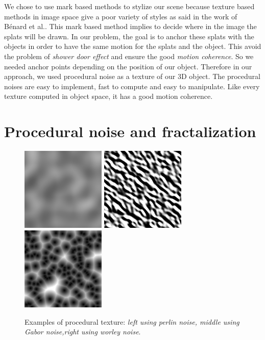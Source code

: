 We chose to use mark based methods to stylize our scene because texture based methods in image space give a poor variety of styles as said in the work of Bénard et al.\cite{benard_dynamic_2009}. This mark based method implies to decide where in the image the splats will be drawn. In our problem, the goal is to anchor these splats with the objects in order to have the same motion for the splats and the object. This avoid the problem of \textit{shower door effect} and ensure the good \textit{motion coherence}. So we needed anchor points depending on the position of our object. Therefore in our approach, we used procedural noise\cite{perlin_improving_2002} as a texture of our 3D object. The procedural noises are easy to implement, fast to compute and easy to manipulate. Like every texture computed in object space, it has a good motion coherence.


\section{Procedural noise and fractalization}

\begin{figure}[H]
    \begin{center}
    \includegraphics[width=40mm, height=40mm]{images/PerlinNoise2d.png}
    \includegraphics[width=40mm, height=40mm]{images/GaborNoise2d.png}
    \includegraphics[width=40mm, height=40mm]{images/WorleyNoise2d.jpg}
    \end{center}
    \caption{Examples of procedural texture: \textit{left using perlin noise, middle using Gabor noise,right using worley noise}.}
    \label{procedural_texture}
\end{figure}

